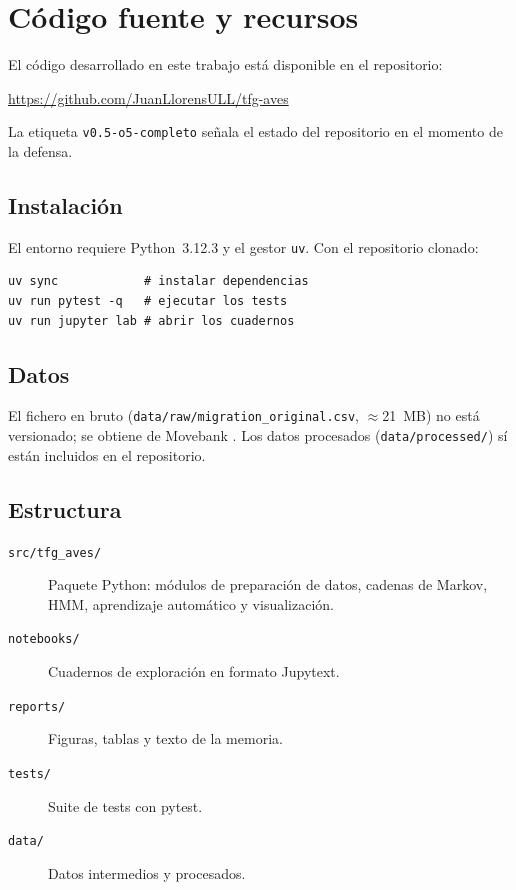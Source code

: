 \chapter{Código fuente y recursos}
\label{ch:codigo}

El código desarrollado en este trabajo está disponible en el repositorio:

\begin{center}
  \url{https://github.com/JuanLlorensULL/tfg-aves}
\end{center}

La etiqueta \texttt{v0.5-o5-completo} señala el estado del repositorio
en el momento de la defensa.

\section*{Instalación}

El entorno requiere Python~3.12.3 y el gestor \texttt{uv}.
Con el repositorio clonado:

\begin{verbatim}
uv sync            # instalar dependencias
uv run pytest -q   # ejecutar los tests
uv run jupyter lab # abrir los cuadernos
\end{verbatim}

\section*{Datos}

El fichero en bruto (\texttt{data/raw/migration\_original.csv},
$\approx$21~MB) no está versionado; se obtiene de Movebank
\cite{movebank_gulls}. Los datos procesados (\texttt{data/processed/})
sí están incluidos en el repositorio.

\section*{Estructura}

\begin{description}
  \item[\texttt{src/tfg\_aves/}] Paquete Python: módulos de preparación
    de datos, cadenas de Markov, HMM, aprendizaje automático y visualización.
  \item[\texttt{notebooks/}] Cuadernos de exploración en formato Jupytext.
  \item[\texttt{reports/}] Figuras, tablas y texto de la memoria.
  \item[\texttt{tests/}] Suite de tests con pytest.
  \item[\texttt{data/}] Datos intermedios y procesados.
\end{description}
